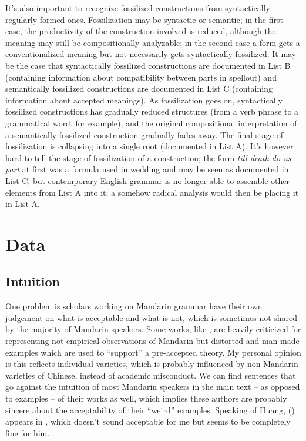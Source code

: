 \documentclass[UTF8, a4paper, oneside, scheme=plain, 12pt]{ctexrep}
\newcommand{\form}[1]{\emph{#1}}
\begin{document}
{It's also important to recognize fossilized constructions
from syntactically regularly formed ones. 
Fossilization may be syntactic or semantic; 
in the first case, 
the productivity of the construction involved is reduced, 
although the meaning may still be compositionally analyzable; 
in the second case a form gets a conventionalized meaning
but not necessarily gets syntactically fossilized.
It may be the case that
syntactically fossilized constructions 
are documented in List B (containing information about compatibility between parts in spellout) 
and semantically fossilized constructions are documented in List C 
(containing information about accepted meanings).
As fossilization goes on, 
syntactically fossilized constructions 
has gradually reduced structures 
(from a verb phrase to a grammatical word, for example), 
and the original compositional interpretation of a semantically fossilized construction
gradually fades away. 
The final stage of fossilization is collapsing into a single root
(documented in List A).
It's however hard to tell the stage of fossilization of a construction; 
the form \form{till death do us part} 
at first was a formula used in wedding 
and may be seen as documented in List C, 
but contemporary English grammar 
is no longer able to assemble other elements from List A into it;
a somehow radical analysis would then be placing it in List A. 

}

\section{Data}\label{sec:data}

\subsection{Intuition}

One problem is scholars working on Mandarin grammar 
have their own judgement on what is acceptable and what is not, 
which is sometimes not shared by the majority of Mandarin speakers.
Some works, like \citet{huang2013}, 
are heavily criticized for 
representing not empirical observations of Mandarin
but distorted and man-made examples 
which are used to ``support'' a pre-accepted theory.
My personal opinion is this reflects individual varieties, 
which is probably influenced by non-Mandarin varieties of Chinese,
instead of academic misconduct.
We can find sentences that go against the intuition of most Mandarin speakers 
in the main text -- as opposed to examples -- of their works as well, 
which implies these authors are probably 
sincere about the acceptability of their ``weird'' examples.
Speaking of Huang, () appears in \citet{huang2007},
which doesn't sound acceptable for me but seems to be completely fine for him.
\end{document}
